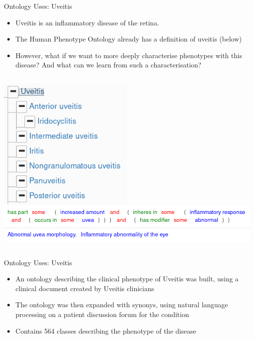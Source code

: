 \documentclass[aspectratio=169]{beamer} %
\begin{document}
\begin{frame}{Ontology Uses: Uveitis}
  \begin{itemize}
    \item Uveitis is an inflammatory disease of the retina.
    \item The Human Phenotype Ontology already has a definition of uveitis
    (below)
    \item However, what if we want to more deeply characterise phenotypes with
    this disease? And what can we learn from such a characterisation?
  \end{itemize}

  \begin{columns}
      \includegraphics[width=0.5\textwidth]{resources/uveitis.png}
      \includegraphics[width=\textwidth]{resources/uv2.png}
  \end{columns}
\end{frame}

\begin{frame}{Ontology Uses: Uveitis}
  \begin{itemize}
    \item An ontology describing the clinical phenotype of Uveitis was built,
    using a clinical document created by Uveitis clinicians
    \item The ontology was then expanded with synonys, using natural language
    processing on a patient discussion forum for the condition
    \item Contains 564 classes describing the phenotype of the disease
  \end{itemize}
\end{frame}
\end{document}
